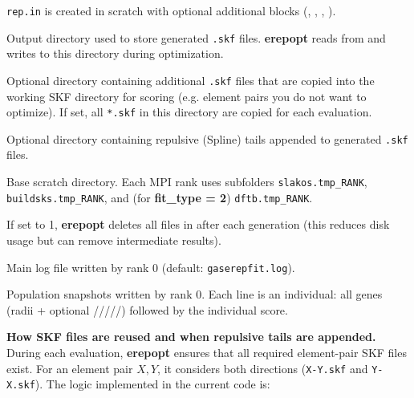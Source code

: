 \begin{description}
\texttt{rep.in} is created in scratch with optional additional blocks (, , , ).
\item[\is{libdir}] Output directory used to store generated \texttt{.skf} files. \textbf{erepopt} reads from
and writes to this directory during optimization.
\item[\is{libadddir}] Optional directory containing additional \texttt{.skf} files that are copied into the working
SKF directory for scoring (e.g. element pairs you do not want to optimize). If set, all \texttt{*.skf} in this
directory are copied for each evaluation.
\item[\is{repadddir}] Optional directory containing repulsive (Spline) tails appended to generated \texttt{.skf} files.
\item[\is{scratchfolder}] Base scratch directory. Each MPI rank uses subfolders
\texttt{slakos.tmp\_RANK}, \texttt{buildsks.tmp\_RANK}, and (for \textbf{fit\_type = 2}) \texttt{dftb.tmp\_RANK}.
\item[\is{skfclean}] If set to 1, \textbf{erepopt} deletes all files in  after each generation
(this reduces disk usage but can remove intermediate results).
\item[\is{outfile}] Main log file written by rank 0 (default: \texttt{gaserepfit.log}).
\item[\is{popinitialfile, popfinalfile}] Population snapshots written by rank 0. Each line is an individual:
all genes (radii + optional /////)
followed by the individual score.
\end{description}

\textbf{How SKF files are reused and when repulsive tails are appended.}
During each evaluation, \textbf{erepopt} ensures that all required element-pair SKF files exist.
For an element pair \(X,Y\), it considers both directions (\texttt{X-Y.skf} and \texttt{Y-X.skf}).
The logic implemented in the current code is:

